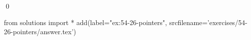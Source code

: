 
\begin{ex}
  \label{ex:54-26-pointers}
  
  \qed
\end{ex}
\begin{python0}
from solutions import *
add(label="ex:54-26-pointers",
    srcfilename='exercises/54-26-pointers/answer.tex')
\end{python0}
